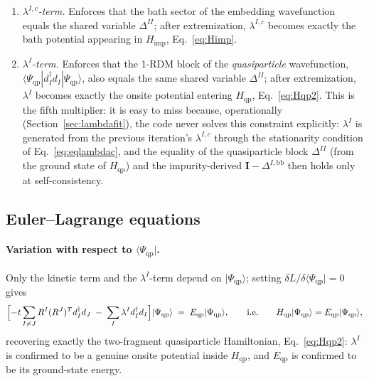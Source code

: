 \documentclass[11pt]{article}
\newcommand{\Hqp}{H_{\mathrm{qp}}}
\newcommand{\Himp}{H_{\mathrm{imp}}}
\begin{document}
\begin{enumerate}
    $V^I$ itself becomes the hybridization entering $\Himp$.
  \item \emph{$\lambda^{I,c}$-term.} Enforces that the bath sector of the
    embedding wavefunction equals the shared variable $\Delta^{II}$; after
    extremization, $\lambda^{I,c}$ becomes exactly the bath potential
    appearing in $\Himp$, Eq.~\eqref{eq:Himp}.
  \item \emph{$\lambda^I$-term.} Enforces that the 1-RDM block of the
    \emph{quasiparticle} wavefunction, $\langle\Psi_{\mathrm{qp}}|d^{\dagger}_Id_I|\Psi_{\mathrm{qp}}\rangle$,
    also equals the same shared variable $\Delta^{II}$; after extremization,
    $\lambda^I$ becomes exactly the onsite potential entering $\Hqp$,
    Eq.~\eqref{eq:Hqp2}. This is the fifth multiplier: it is easy to miss
    because, operationally (Section~\ref{sec:lambdafit}), the code never
    solves this constraint explicitly: $\lambda^I$ is generated from the
    previous iteration's $\lambda^{I,c}$ through the stationarity condition of
    Eq.~\eqref{eq:eqlambdac}, and the equality of the quasiparticle block
    $\Delta^{II}$ (from the ground state of $\Hqp$) and the impurity-derived
    $\mathbf I-\Delta^{I,\mathrm{bb}}$ then holds only at self-consistency.
\end{enumerate}

\subsection{Euler--Lagrange equations}
\label{sec:elderive}

\paragraph{Variation with respect to $\langle\Psi_{\mathrm{qp}}|$.} Only the
kinetic term and the $\lambda^I$-term depend on $|\Psi_{\mathrm{qp}}\rangle$;
setting $\delta L/\delta\langle\Psi_{\mathrm{qp}}| = 0$ gives
\begin{equation}
  \Bigl[-t\sum_{I\neq J}R^I(R^J)^{T}d^{\dagger}_Id_J \;-\; \sum_I\lambda^I d^{\dagger}_Id_I\Bigr]
  |\Psi_{\mathrm{qp}}\rangle \;=\; E_{\mathrm{qp}}|\Psi_{\mathrm{qp}}\rangle,
  \qquad\text{i.e.}\qquad \Hqp|\Psi_{\mathrm{qp}}\rangle = E_{\mathrm{qp}}|\Psi_{\mathrm{qp}}\rangle,
\end{equation}
recovering exactly the two-fragment quasiparticle Hamiltonian, Eq.~\eqref{eq:Hqp2}:
$\lambda^I$ is confirmed to be a genuine onsite potential inside $\Hqp$, and
$E_{\mathrm{qp}}$ is confirmed to be its ground-state energy.
\end{document}
